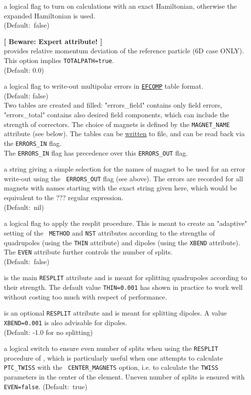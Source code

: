 \begin{madlist}
   a logical flag to turn on calculations with an exact
  Hamiltonian, otherwise the expanded Hamiltonian is used. \\
  (Default:~false)

   {\bf [ Beware: Expert attribute! ]}\\
  provides relative momentum deviation of the reference particle (6D case
  ONLY). This option implies {\tt TOTALPATH=true}. \\
  (Default: 0.0)

   a logical flag to write-out multipolar errors
  in \hyperref[sec:efcomp]{\tt EFCOMP} table format. 
  \\ (Default: false) \\
  Two tables are created and filled: "errors\_field" contains only
  field errors, "errors\_total" contains also desired field
  components, which can include the strength of correctors.  
  The choice of magnets is defined by the {\tt MAGNET\_NAME}
  attribute (see below). 
  The tables can be \hyperref[sec:write]{written} to file, and can be
  read back via the {\tt ERRORS\_IN} flag.\\ 
  The {\tt ERRORS\_IN} flag has precedence over this {\tt ERRORS\_OUT} flag.

   a string giving a simple selection for the
  names of magnet to be used for an error write-out using the {\tt
  ERRORS\_OUT} flag (see above). The errors are recorded for all
  magnets with names starting with the exact string given here, which
  would be equivalent to the ??? regular expression.\\
  (Default:~nil)

   a logical flag to apply the \ptc resplit
  procedure. This is meant to create an "adaptive" setting of the {\tt
    METHOD} and {\tt NST} attributes according to the strengths of
  quadrupoles (using the {\tt THIN}  attribute) and dipoles (using the
  {\tt XBEND} attribute). The {\tt EVEN} attribute further controls the
  number of splits.  \\
  (Default:~false)

   is the main {\tt RESPLIT} attribute and is meant for
  splitting quadrupoles according to their strength. The default value
  {\tt THIN=0.001} has shown in practice to work well without costing
  too much with respect of performance.
  
   is an optional {\tt RESPLIT} attribute and is meant for
  splitting dipoles. A value {\tt XBEND=0.001} is also advisable for
  dipoles. \\
  (Default: -1.0 for no splitting)

   a logical switch to ensure even number of splits when
  using the {\tt RESPLIT}  procedure of \ptc, which is particularly
  useful when one attempts to calculate {\tt PTC\_TWISS} with the {\tt
    CENTER\_MAGNETS} option, i.e. to calculate the {\tt TWISS}
  parameters in the center of the element. 
  Uneven number of splits is ensured with {\tt EVEN=false}.  
  (Default:~true)
\end{madlist}

